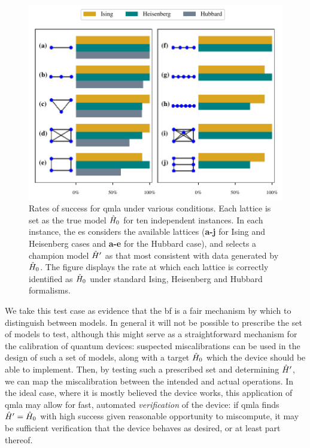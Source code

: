 \begin{figure}[t]
    \begin{center}
        \includegraphics{theoretical_study/figures/lattices/lattice_successes_two_column.pdf}
    \end{center}
    \caption[\gls{qmla} success rates for lattices]{
        Rates of success for \gls{qmla} under various conditions. 
        Each lattice is set as the \gls{true model} $\hat{H}_0$ for ten independent instances. 
        In each instance, the \gls{es} considers the available lattices 
            (\textbf{a-j} for Ising and Heisenberg cases and \textbf{a-e} for the Hubbard case), 
            and selects a \gls{champion model} $\hat{H}^{\prime}$ as that most consistent with data generated by $\hat{H}_0$. 
        The figure displays the rate at which each lattice is correctly identified as $\hat{H}_0$
            under standard Ising, Heisenberg and Hubbard formalisms. 
        \figtableref
    }
    \label{fig:lattice_success_rates}
\end{figure}    

We take this test case as evidence that the \gls{bf} is a fair mechanism by which to distinguish between models. 
In general it will not be possible to prescribe the set of models to test, 
    although this might serve as a straightforward mechanism for the calibration of quantum devices:
    suspected miscalibrations can be used in the design of such a set of models, 
    along with a target $\hat{H}_0$ which the device should be able to implement. 
Then, by testing such a prescribed set and determining $\hat{H}^{\prime}$, 
    we can map the miscalibration between the intended and actual operations. 
In the ideal case, where it is mostly believed the device works, 
    this application of \gls{qmla} may allow for fast, automated \emph{verification} of the device:
    if \gls{qmla} finds $\hat{H}^{\prime}=\hat{H}_0$ with high success given reasonable opportunity to miscompute, 
    it may be sufficient verification that the device behaves as desired, 
    or at least part thereof. 

